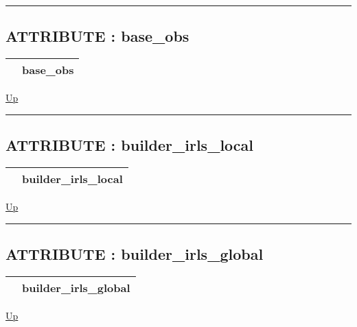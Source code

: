 \par


\rule{\textwidth}{0.4pt}
\subsection*{ATTRIBUTE : base\_obs}
\hypertarget{ecldoc:logisticregression.constants.base_obs}{}

{\renewcommand{\arraystretch}{1.5}
\begin{tabularx}{\textwidth}{|>{\raggedright\arraybackslash}l|X|}
\hline
\hspace{0pt} & base\_obs \\
\hline
\end{tabularx}
}

\hyperlink{ecldoc:LogisticRegression.Constants}{Up}

\par


\rule{\textwidth}{0.4pt}
\subsection*{ATTRIBUTE : builder\_irls\_local}
\hypertarget{ecldoc:logisticregression.constants.builder_irls_local}{}

{\renewcommand{\arraystretch}{1.5}
\begin{tabularx}{\textwidth}{|>{\raggedright\arraybackslash}l|X|}
\hline
\hspace{0pt} & builder\_irls\_local \\
\hline
\end{tabularx}
}

\hyperlink{ecldoc:LogisticRegression.Constants}{Up}

\par


\rule{\textwidth}{0.4pt}
\subsection*{ATTRIBUTE : builder\_irls\_global}
\hypertarget{ecldoc:logisticregression.constants.builder_irls_global}{}

{\renewcommand{\arraystretch}{1.5}
\begin{tabularx}{\textwidth}{|>{\raggedright\arraybackslash}l|X|}
\hline
\hspace{0pt} & builder\_irls\_global \\
\hline
\end{tabularx}
}

\hyperlink{ecldoc:LogisticRegression.Constants}{Up}

